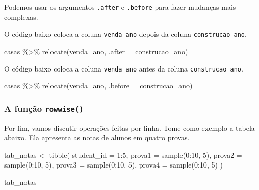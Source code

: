 \documentclass[
]{book}
\newenvironment{Shaded}{\begin{snugshade}}{\end{snugshade}}
\newcommand{\AttributeTok}[1]{\textcolor[rgb]{0.77,0.63,0.00}{#1}}
\newcommand{\DecValTok}[1]{\textcolor[rgb]{0.00,0.00,0.81}{#1}}
\newcommand{\FunctionTok}[1]{\textcolor[rgb]{0.00,0.00,0.00}{#1}}
\newcommand{\NormalTok}[1]{#1}
\newcommand{\OtherTok}[1]{\textcolor[rgb]{0.56,0.35,0.01}{#1}}
\newcommand{\SpecialCharTok}[1]{\textcolor[rgb]{0.00,0.00,0.00}{#1}}
\begin{document}
Podemos usar os argumentos \texttt{.after} e \texttt{.before} para fazer mudanças mais complexas.

O código baixo coloca a coluna \texttt{venda\_ano} depois da coluna \texttt{construcao\_ano}.

\begin{Shaded}
\begin{Highlighting}[]
\NormalTok{casas }\SpecialCharTok{\%\textgreater{}\%}
  \FunctionTok{relocate}\NormalTok{(venda\_ano, }\AttributeTok{.after =}\NormalTok{ construcao\_ano)}
\end{Highlighting}
\end{Shaded}

O código baixo coloca a coluna \texttt{venda\_ano} antes da coluna \texttt{construcao\_ano}.

\begin{Shaded}
\begin{Highlighting}[]
\NormalTok{casas }\SpecialCharTok{\%\textgreater{}\%}
  \FunctionTok{relocate}\NormalTok{(venda\_ano, }\AttributeTok{.before =}\NormalTok{ construcao\_ano)}
\end{Highlighting}
\end{Shaded}

\hypertarget{a-funuxe7uxe3o-rowwise}{%
\subsubsection*{\texorpdfstring{A função \texttt{rowwise()}}{A função rowwise()}}\label{a-funuxe7uxe3o-rowwise}}

Por fim, vamos discutir operações feitas por linha. Tome como exemplo a tabela abaixo. Ela apresenta as notas de alunos em quatro provas.

\begin{Shaded}
\begin{Highlighting}[]
\NormalTok{tab\_notas }\OtherTok{\textless{}{-}} \FunctionTok{tibble}\NormalTok{(}
  \AttributeTok{student\_id =} \DecValTok{1}\SpecialCharTok{:}\DecValTok{5}\NormalTok{,}
  \AttributeTok{prova1 =} \FunctionTok{sample}\NormalTok{(}\DecValTok{0}\SpecialCharTok{:}\DecValTok{10}\NormalTok{, }\DecValTok{5}\NormalTok{),}
  \AttributeTok{prova2 =} \FunctionTok{sample}\NormalTok{(}\DecValTok{0}\SpecialCharTok{:}\DecValTok{10}\NormalTok{, }\DecValTok{5}\NormalTok{),}
  \AttributeTok{prova3 =} \FunctionTok{sample}\NormalTok{(}\DecValTok{0}\SpecialCharTok{:}\DecValTok{10}\NormalTok{, }\DecValTok{5}\NormalTok{),}
  \AttributeTok{prova4 =} \FunctionTok{sample}\NormalTok{(}\DecValTok{0}\SpecialCharTok{:}\DecValTok{10}\NormalTok{, }\DecValTok{5}\NormalTok{)}
\NormalTok{)}

\NormalTok{tab\_notas}
\end{Highlighting}
\end{Shaded}
\end{document}
